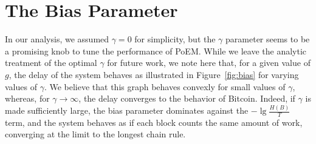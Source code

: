 \section{The Bias Parameter}

In our analysis, we assumed $\gamma = 0$ for simplicity, but the $\gamma$ parameter
seems to be a promising knob to tune the performance of PoEM. While we leave the
analytic treatment of the optimal $\gamma$ for future work, we note here that,
for a given value of $g$, the delay of the system behaves as illustrated in Figure~\ref{fig:bias}
for varying values of $\gamma$. We believe that this graph behaves convexly for
small values of $\gamma$, whereas, for $\gamma \to \infty$, the delay converges to
the behavior of Bitcoin. Indeed, if $\gamma$ is made sufficiently large, the bias
parameter dominates against the $-\lg\frac{H(B)}{T}$ term, and the system behaves
as if each block counts the same amount of work, converging at the limit to the
longest chain rule.

